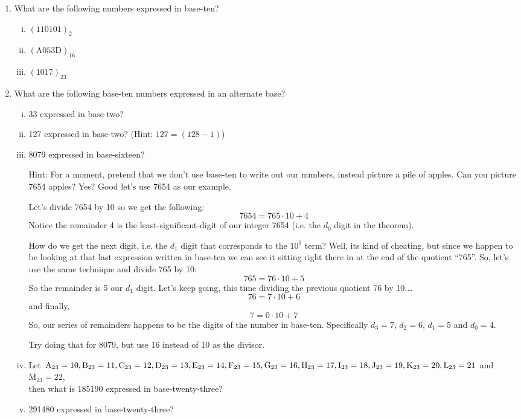 \documentclass{article}
\begin{document}
\begin{enumerate}
\item What are the following numbers expressed in base-ten?
\begin{enumerate}[i)]
\item $(110101)_2$
\item $(\text{A}053\text{D})_{16}$
\item $(1017)_{23}$
\end{enumerate}
\item What are the following base-ten numbers expressed in an alternate base?
\begin{enumerate}[i)]
\item 33 expressed in base-two?
\item 127 expressed in base-two? (Hint: $127 = (128-1)$)
\item 8079 expressed in base-sixteen?

Hint: For a moment, pretend that we don't use base-ten to
write out our numbers, instead picture a pile of apples.
Can you picture 7654 apples?  Yes?  Good let's use 7654 as our example.

Let's divide 7654 by 10 so we get the following:
\[7654 = 765\cdot{}10+4\]
Notice the remainder 4 is the least-significant-digit of our
integer 7654  (i.e. the $d_0$ digit in the theorem).

How do we get the next digit, i.e. the $d_1$ digit that corresponds to the $10^1$ term? Well, its kind of cheating, but
since we happen to be looking at that last expression written in
base-ten we can see it sitting right there in at the
end of the quotient ``765''. So, let's use the same technique and divide 765 by 10:
\[765 = 76\cdot{}10+5\]
So the remainder is 5 our $d_1$ digit.  Let's keep going, this time dividing the previous quotient 76 by 10.\dots	
\[76 = 7\cdot{}10+6\]
and finally,
\[7= 0\cdot{}10+7\]
So, our series of remainders happens to be the digits of the number in base-ten.
Specifically $d_3 = 7$, $d_2=6$, $d_1=5$ and $d_0=4$.

Try doing that for 8079, but use 16 instead of 10 as the divisor.
\item Let $\text{A}_{23} = 10, \text{B}_{23} = 11, \text{C}_{23} = 12, \text{D}_{23} = 13, \text{E}_{23} = 14, \text{F}_{23} = 15,
\text{G}_{23} = 16,\\
\text{H}_{23} = 17, \text{I}_{23} = 18, \text{J}_{23} = 19, \text{K}_{23} = 20, \text{L}_{23} = 21$ and $\text{M}_{23} = 22$,\\
then what is 185190 expressed in base-twenty-three?
\item 291480 expressed in base-twenty-three?
\end{enumerate}

\end{enumerate}
\end{document}
